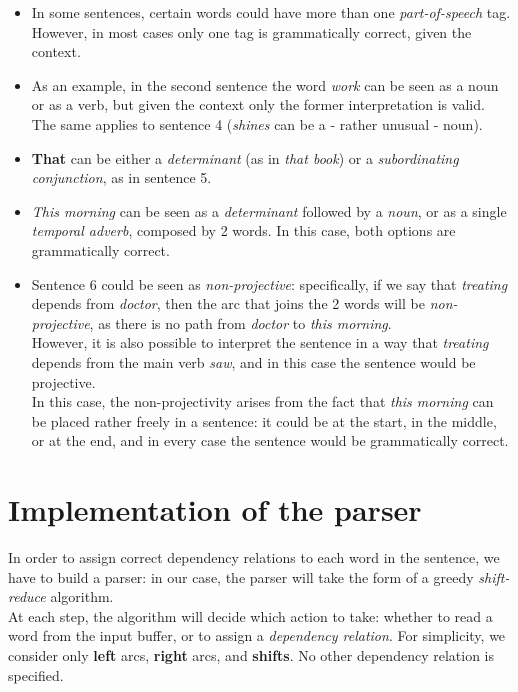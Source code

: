 \documentclass[
12pt,
a4paper,
oneside,
headinclude,
footinclude]{article}
\begin{document}
    \begin{itemize}
        \item In some sentences, certain words could have more than one \textit{part-of-speech} tag. However, in most cases only one tag is grammatically correct, given the context.
        \item As an example, in the second sentence the word \textit{work} can be seen as a noun or as a verb, but given the context only the former interpretation is valid. The same applies to sentence 4 (\textit{shines} can be a - rather unusual - noun). 
        \item \textbf{That} can be either a \textit{determinant} (as in \textit{that book}) or a \textit{subordinating conjunction}, as in sentence 5.
        \item \textit{This morning} can be seen as a \textit{determinant} followed by a \textit{noun}, or as a single \textit{temporal adverb}, composed by 2 words. In this case, both options are grammatically correct.
        \item Sentence 6 could be seen as \textit{non-projective}: specifically, if we say that \textit{treating} depends from \textit{doctor}, then the arc that joins the 2 words will be \textit{non-projective}, as there is no path from \textit{doctor} to \textit{this morning}.\\
        However, it is also possible to interpret the sentence in a way that \textit{treating} depends from the main verb \textit{saw}, and in this case the sentence would be projective.\\
        In this case, the non-projectivity arises from the fact that \textit{this morning} can be placed rather freely in a sentence: it could be at the start, in the middle, or at the end, and in every case the sentence would be grammatically correct.
    \end{itemize}

    
    \section{Implementation of the parser}
    
    In order to assign correct dependency relations to each word in the sentence, we have to build a parser: in our case, the parser will take the form of a greedy \textit{shift-reduce} algorithm.\\
    At each step, the algorithm will decide which action to take: whether to read a word from the input buffer, or to assign a \textit{dependency relation}. For simplicity, we consider only \textbf{left} arcs, \textbf{right} arcs, and \textbf{shifts}. No other dependency relation is specified.
    
\end{document}
